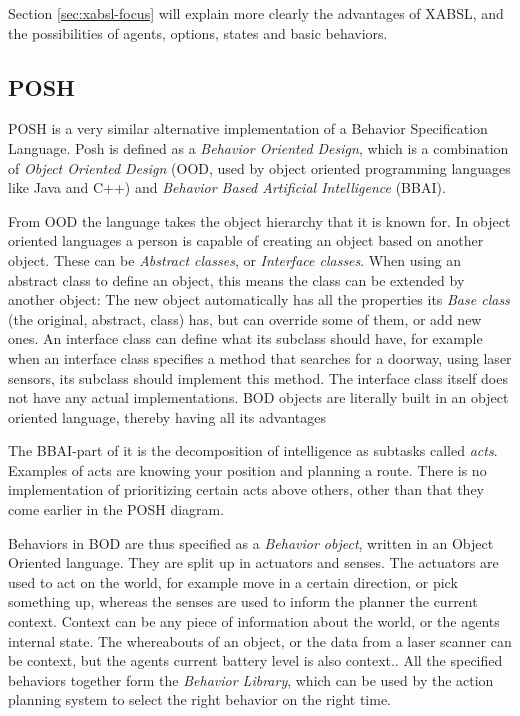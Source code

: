 \documentclass[a4paper,10pt]{article}
\begin{document}
Section \ref{sec:xabsl-focus} will explain more clearly the advantages of XABSL,
and the possibilities of agents, options, states and basic behaviors.

\subsection{POSH}
POSH \cite{brom2006posh} is a very similar alternative implementation of a Behavior Specification
Language. Posh is defined as a \textit{Behavior Oriented Design}, which is
a combination of \textit{Object Oriented Design} (OOD, used by object oriented
programming languages like Java and C++) and \textit{Behavior Based Artificial
Intelligence} (BBAI). 

From OOD the language takes the object hierarchy that it is known for. In object
oriented languages a person is capable of creating an object based on another
object. These can be \textit{Abstract classes}, or \textit{Interface classes}. When using an
abstract class to define an object, this means the class can be extended by
another object: The new object automatically has all the properties its
\textit{Base class} (the original, abstract, class) has, but can override some
of them, or add new ones. An interface class can define what its subclass should
have, for example when an interface class specifies a method that searches for a
doorway, using laser sensors, its subclass should implement this method. The
interface class itself does not have any actual implementations. BOD objects are literally built in an object oriented language, thereby having
all its advantages

The BBAI-part of it is the decomposition of intelligence
as subtasks called \textit{acts}. Examples of acts are knowing your position and
planning a route. There is no implementation of prioritizing certain acts above
others, other than that they come earlier in the POSH diagram. 

Behaviors in BOD are thus specified as a \textit{Behavior object}, written in an
Object Oriented language. They are split up in actuators and senses. The
actuators are used to act on the world, for example move in a certain direction,
or pick something up, whereas the senses are used to inform the planner the
current context. Context can be any piece of information about the world, or the
agents internal state. The
whereabouts of an object, or the data from a laser scanner can be context, but
the agents current battery level is also context.. All the specified behaviors together form the
\textit{Behavior Library}, which can be used by the action planning system to
select the right behavior on the right time. 
\end{document}

